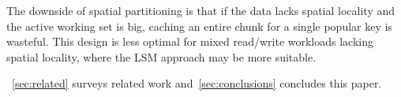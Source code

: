 The downside of spatial partitioning is that if the data lacks spatial locality and the active working set is big, 
caching an entire chunk for a single popular key is wasteful.  This design is less optimal for mixed read/write workloads lacking spatial locality,
where the LSM approach may be more suitable.  

~\cref{sec:related}  surveys related work and~\cref{sec:conclusions} concludes this paper. 
